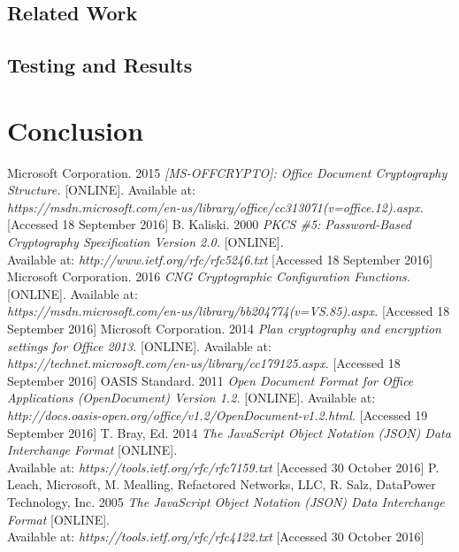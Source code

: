 \documentclass[11pt,oneside]{fithesis2}
\begin{document}
\section{Related Work}\label{related_work}

\section{Testing and Results}

\chapter{Conclusion}

\begin{thebibliography}{}
	Microsoft Corporation. 2015 \textit{[MS-OFFCRYPTO]: Office Document Cryptography Structure.} [ONLINE].
Available at: \\ \textit{https://msdn.microsoft.com/en-us/library/office/cc313071(v=office.12).aspx.} [Accessed 18 September 2016]
	 B. Kaliski. 2000 \textit{PKCS \#5: Password-Based Cryptography Specification Version 2.0.} [ONLINE].\\ Available at: \textit{http://www.ietf.org/rfc/rfc5246.txt} [Accessed 18 September 2016]
	Microsoft Corporation. 2016 \textit{CNG Cryptographic Configuration Functions.} [ONLINE].
Available at: \\ \textit{https://msdn.microsoft.com/en-us/library/bb204774(v=VS.85).aspx.} [Accessed 18 September 2016]
	Microsoft Corporation. 2014 \textit{Plan cryptography and encryption settings for Office 2013.} [ONLINE].
Available at: \\ \textit{https://technet.microsoft.com/en-us/library/cc179125.aspx.} [Accessed 18 September 2016]
	OASIS Standard. 2011 \textit{Open Document Format for Office Applications (OpenDocument) Version 1.2.} [ONLINE]. Available at: \textit{http://docs.oasis-open.org/office/v1.2/OpenDocument-v1.2.html.} [Accessed 19 September 2016]
	 T. Bray, Ed. 2014 \textit{The JavaScript Object Notation (JSON) Data Interchange Format} [ONLINE].\\ Available at: 	\textit{https://tools.ietf.org/rfc/rfc7159.txt} [Accessed 30 October 2016]
	 P. Leach, Microsoft, M. Mealling, Refactored Networks, LLC, R. Salz, DataPower Technology, Inc.  2005 \textit{The JavaScript Object Notation (JSON) Data Interchange Format} [ONLINE].\\ Available at: \textit{https://tools.ietf.org/rfc/rfc4122.txt} [Accessed 30 October 2016]

\end{thebibliography}
\end{document}
